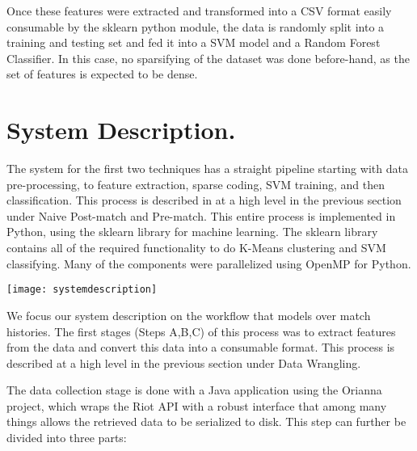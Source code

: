 Once these features were extracted and transformed into a CSV format easily consumable by the sklearn python module, the data is randomly split into a training and testing set and fed it into a SVM model and a Random Forest Classifier. In this case, no sparsifying of the dataset was done before-hand, as the set of features is expected to be dense.  

\section{System Description. }

The system for the first two techniques has a straight pipeline starting with data pre-processing, to feature extraction, sparse coding, SVM training, and then classification.  This process is described in at a high level in the previous section under Naive Post-match and Pre-match.  This entire process is implemented in Python, using the sklearn library for machine learning.  The sklearn library contains all of the required functionality to do K-Means clustering and SVM classifying.  Many of the components were parallelized using OpenMP for Python.  


\texttt{[image: systemdescription]}

We focus our system description on the workflow that models over match histories.  
The first stages (Steps A,B,C) of this process was to extract features from the data and convert this data into a consumable format. This process is described at a high level in the previous section under Data Wrangling.

The data collection stage is done with a Java application using the Orianna project, which wraps the Riot API with a robust interface that among many things allows the retrieved data to be serialized to disk. This step can further be divided into three parts:

